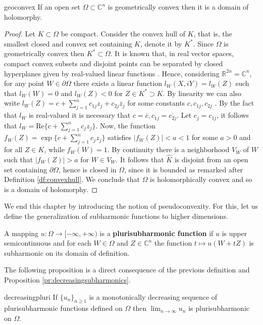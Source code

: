 \begin{mytheo}{}{geoconvex}
If an open set $\Omega\subset \mathbb{C}^n$ is geometrically convex then it is a domain of holomorphy.
\end{mytheo}
\begin{proof}
Let $K\subset \Omega$ be compact. Consider the convex hull of $K$, that is, the smallest closed and convex set containing $K$, denote it by $K^*$. Since $\Omega$ is geometrically convex then $K^* \subset \Omega$. It is known that, in real vector spaces, compact convex subsets and disjoint points can be separated by closed hyperplanes given by real-valued linear functions \cite[Theorem 2.1.10]{hormanderconvex}. Hence, considering $\mathbb{R}^{2n}=\mathbb{C}^n$, for any point $W\in \partial \Omega$ there exists a linear function $l_W(X,iY)=l_W(Z)$ such that $l_W(W)=0$ and $l_W(Z)<0$ for $Z\in K^*\supset K$. By linearity we can also write  $l_W(Z) =c +\sum_{j=1}^n c_{1j}z_j+c_{2j}\overline{z}_{j}$ for some constants $c,c_{1j},c_{2j}$ . By the fact that $l_W$ is real-valued it is necessary that $c=\overline{c},c_{1j}=\overline{c_{2j}}$. Let $c_j=c_{1j}$, it follows that $l_W = \text{Re}\{c+\sum_{j=1}^n c_jz_j\}$. Now, the function $f_W(Z)=\exp\{c+\sum_{j=1}^nc_jz_j\}$ satisfies $|f_W(Z)|<a<1$ for some $a>0$ and for all $Z\in K$, while $f_W(W)=1$. By continuity there is a neighborhood $V_W$ of $W$ such that $|f_W(Z)|>a$ for $W\in V_W$. It follows that $\widehat{K}$ is disjoint from an open set containing $\partial \Omega$, hence is closed in $\Omega$, since it is bounded as remarked after Definition \ref{df:convexhull}. We conclude that $\Omega$ is holomorphically convex and so is a domain of holomorphy.
\end{proof}

We end this chapter by introducing the notion of pseudoconvexity. For this, let us define the generalization of subharmonic functions to higher dimensions.\\
\begin{mydef}{}{}
A mapping $u:\Omega \rightarrow [-\infty,+\infty)$ is a {\bf plurisubharmonic function} if $u$ is upper semicontinuous and for each $W\in \Omega$ and $Z\in \mathbb{C}^n$ the function $t\mapsto u(W+tZ)$ is subharmonic on its domain of definition.
\end{mydef}

The following proposition is a direct consequence of the previous definition and Proposition \ref{pr:decreasingsubharmonics}.

\begin{myprop}{}{decreasingpluri}
If $\{u_n\}_{n\geq 1}$ is a monotonically decreasing sequence of plurisubharmonic functions defined on $\Omega$ then $\lim_{n\rightarrow \infty} u_n$ is plurisubharmonic on $\Omega$.
\end{myprop}

